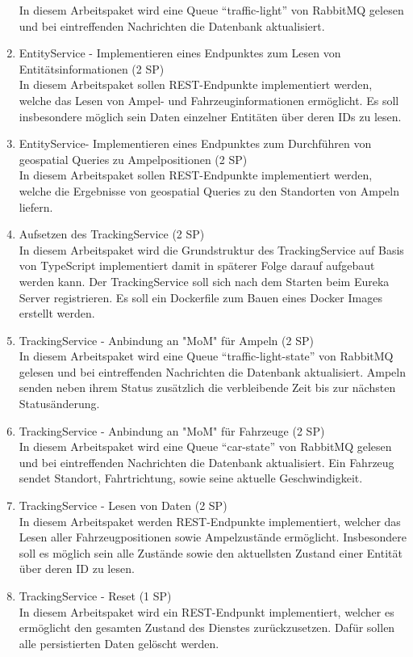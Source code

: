 \begin{enumerate}
  		In diesem Arbeitspaket wird eine Queue \enquote{traffic-light} von RabbitMQ gelesen und bei eintreffenden Nachrichten die Datenbank aktualisiert.
  \item EntityService - Implementieren eines Endpunktes zum Lesen von Entitätsinformationen (2 SP)\\
  		In diesem Arbeitspaket sollen REST-Endpunkte implementiert werden, welche das Lesen von Ampel- und Fahrzeuginformationen ermöglicht.
  		Es soll insbesondere möglich sein Daten einzelner Entitäten über deren IDs zu lesen.
  \item EntityService- Implementieren eines Endpunktes zum Durchführen von geospatial Queries zu Ampelpositionen (2 SP)\\
  		In diesem Arbeitspaket sollen REST-Endpunkte implementiert werden, welche die Ergebnisse von geospatial Queries zu den Standorten von Ampeln liefern.
  \item Aufsetzen des TrackingService (2 SP)\\
  		In diesem Arbeitspaket wird die Grundstruktur des TrackingService auf Basis von TypeScript implementiert damit in späterer Folge darauf aufgebaut werden kann.
  		Der TrackingService soll sich nach dem Starten beim Eureka Server registrieren.
  		Es soll ein Dockerfile zum Bauen eines Docker Images erstellt werden.
  \item TrackingService - Anbindung an "MoM" für Ampeln (2 SP)\\
  		In diesem Arbeitspaket wird eine Queue \enquote{traffic-light-state} von RabbitMQ gelesen und bei eintreffenden Nachrichten die Datenbank aktualisiert.
  		Ampeln senden neben ihrem Status zusätzlich die verbleibende Zeit bis zur nächsten Statusänderung.
  \item TrackingService - Anbindung an "MoM" für Fahrzeuge (2 SP)\\
  		In diesem Arbeitspaket wird eine Queue \enquote{car-state} von RabbitMQ gelesen und bei eintreffenden Nachrichten die Datenbank aktualisiert.
  		Ein Fahrzeug sendet Standort, Fahrtrichtung, sowie seine aktuelle Geschwindigkeit.
  \item TrackingService - Lesen von Daten (2 SP)\\
  		In diesem Arbeitspaket werden REST-Endpunkte implementiert, welcher das Lesen aller Fahrzeugpositionen sowie Ampelzustände ermöglicht.
  		Insbesondere soll es möglich sein alle Zustände sowie den aktuellsten Zustand einer Entität über deren ID zu lesen.
  \item TrackingService - Reset (1 SP)\\
 		In diesem Arbeitspaket wird ein REST-Endpunkt implementiert, welcher es ermöglicht den gesamten Zustand des Dienstes zurückzusetzen.
 		Dafür sollen alle persistierten Daten gelöscht werden.
\end{enumerate}
